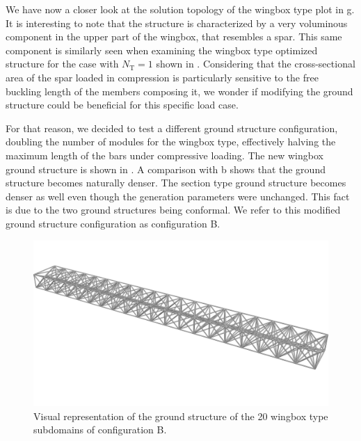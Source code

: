We have now a closer look at the solution topology of the wingbox type plot in g. It is interesting to note that the structure is characterized by a very voluminous component in the upper part of the wingbox, that resembles a spar. This same component is similarly seen when examining the wingbox type optimized structure for the case with $N_\text{T}=1$ shown in . Considering that the cross-sectional area of the spar loaded in compression is particularly sensitive to the free buckling length of the members composing it, we wonder if modifying the ground structure could be beneficial for this specific load case.

For that reason, we decided to test a different ground structure configuration, doubling the number of modules for the wingbox type, effectively halving the maximum length of the bars under compressive loading. The new wingbox ground structure is shown in . A comparison with b shows that the ground structure becomes naturally denser.  The section type ground structure becomes denser as well even though the generation parameters were unchanged. This fact is due to the two ground structures being conformal. We refer to this modified ground structure configuration as configuration B.

\begin{figure}
    \centering
    \includegraphics[width=0.8\linewidth]{figures/07_aeronautic/00_NACA_gs_b/02_GS_c_iso.png}
        \caption{Visual representation of the ground structure of the 20 wingbox type subdomains of configuration B.}
    \label{fig:07_gs_wingbox_b}
\end{figure}

